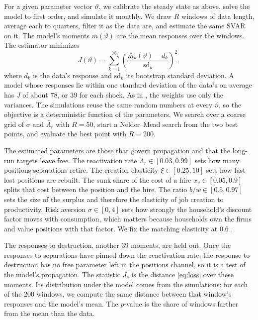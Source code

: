 \documentclass[authoryear, review, 12pt]{elsarticle}
\begin{document}
For a given parameter vector $\vartheta$, we calibrate the steady state as above, solve the model to first order, and simulate it monthly. We draw $R$ windows of data length, average each to quarters, filter it as the data are, and estimate the same SVAR on it. The model's moments $\bar m(\vartheta)$ are the mean responses over the windows. The estimator minimizes
\begin{equation}\label{eq:loss}
J(\vartheta)=\sum_{k=1}^{78}\left(\frac{\bar m_k(\vartheta)-d_k}{\text{sd}_k}\right)^2,
\end{equation}
where $d_k$ is the data's response and $\text{sd}_k$ its bootstrap standard deviation. A model whose responses lie within one standard deviation of the data's on average has $J$ of about 78, or 39 for each shock. As in \citet{christiano_2005}, the weights use only the variances. The simulations reuse the same random numbers at every $\vartheta$, so the objective is a deterministic function of the parameters. We search over a coarse grid of $\sigma$ and $\bar\Lambda_r$ with $R=50$, start a Nelder--Mead search from the two best points, and evaluate the best point with $R=200$.

The estimated parameters are those that govern propagation and that the long-run targets leave free. The reactivation rate $\bar\Lambda_r\in[0.03,0.99]$ sets how many positions separations retire. The creation elasticity $\xi\in[0.25,10]$ sets how fast lost positions are rebuilt. The sunk share of the cost of a hire $x_v\in[0.05,0.9]$ splits that cost between the position and the hire. The ratio $b/w\in[0.5,0.97]$ sets the size of the surplus and therefore the elasticity of job creation to productivity. Risk aversion $\sigma\in[0,4]$ sets how strongly the household's discount factor moves with consumption, which matters because households own the firms and value positions with that factor. We fix the matching elasticity at 0.6 \citep{petrongolo_2001}.

The responses to destruction, another 39 moments, are held out. Once the responses to separations have pinned down the reactivation rate, the response to destruction has no free parameter left in the positions channel, so it is a test of the model's propagation. The statistic $J_\delta$ is the distance \eqref{eq:loss} over these moments. Its distribution under the model comes from the simulations: for each of the 200 windows, we compute the same distance between that window's responses and the model's mean. The $p$-value is the share of windows farther from the mean than the data.
\end{document}
